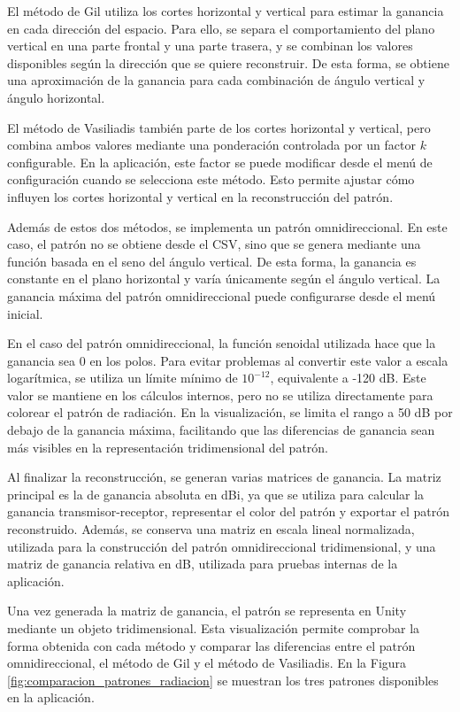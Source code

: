 El método de Gil utiliza los cortes horizontal y vertical para estimar la ganancia en cada dirección del espacio. Para ello, se separa el comportamiento del plano vertical en una parte frontal y una parte trasera, y se combinan los valores disponibles según la dirección que se quiere reconstruir. De esta forma, se obtiene una aproximación de la ganancia para cada combinación de ángulo vertical y ángulo horizontal.

El método de Vasiliadis también parte de los cortes horizontal y vertical, pero combina ambos valores mediante una ponderación controlada por un factor $k$ configurable. En la aplicación, este factor se puede modificar desde el menú de configuración cuando se selecciona este método. Esto permite ajustar cómo influyen los cortes horizontal y vertical en la reconstrucción del patrón.

Además de estos dos métodos, se implementa un patrón omnidireccional. En este caso, el patrón no se obtiene desde el CSV, sino que se genera mediante una función basada en el seno del ángulo vertical. De esta forma, la ganancia es constante en el plano horizontal y varía únicamente según el ángulo vertical. La ganancia máxima del patrón omnidireccional puede configurarse desde el menú inicial.

En el caso del patrón omnidireccional, la función senoidal utilizada hace que la ganancia sea 0 en los polos. Para evitar problemas al convertir este valor a escala logarítmica, se utiliza un límite mínimo de $10^{-12}$, equivalente a -120 dB. Este valor se mantiene en los cálculos internos, pero no se utiliza directamente para colorear el patrón de radiación. En la visualización, se limita el rango a 50 dB por debajo de la ganancia máxima, facilitando que las diferencias de ganancia sean más visibles en la representación tridimensional del patrón.

Al finalizar la reconstrucción, se generan varias matrices de ganancia. La matriz principal es la de ganancia absoluta en dBi, ya que se utiliza para calcular la ganancia transmisor-receptor, representar el color del patrón y exportar el patrón reconstruido. Además, se conserva una matriz en escala lineal normalizada, utilizada para la construcción del patrón omnidireccional tridimensional, y una matriz de ganancia relativa en dB, utilizada para pruebas internas de la aplicación.

Una vez generada la matriz de ganancia, el patrón se representa en Unity mediante un objeto tridimensional. Esta visualización permite comprobar la forma obtenida con cada método y comparar las diferencias entre el patrón omnidireccional, el método de Gil y el método de Vasiliadis. En la Figura \ref{fig:comparacion_patrones_radiacion} se muestran los tres patrones disponibles en la aplicación.

